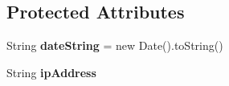 \subsection*{Protected Attributes}
\begin{DoxyCompactItemize}
\item 
\hypertarget{classgov_1_1fnal_1_1ppd_1_1ZZattic_1_1EncodedCarrier_a52e1a21b7119b6db2906234788c669ac}{String {\bfseries date\-String} = new Date().to\-String()}\label{classgov_1_1fnal_1_1ppd_1_1ZZattic_1_1EncodedCarrier_a52e1a21b7119b6db2906234788c669ac}

\item 
\hypertarget{classgov_1_1fnal_1_1ppd_1_1ZZattic_1_1EncodedCarrier_a92ce35341bcff56215a1541d67eeb04a}{String {\bfseries ip\-Address}}\label{classgov_1_1fnal_1_1ppd_1_1ZZattic_1_1EncodedCarrier_a92ce35341bcff56215a1541d67eeb04a}

\end{DoxyCompactItemize}


